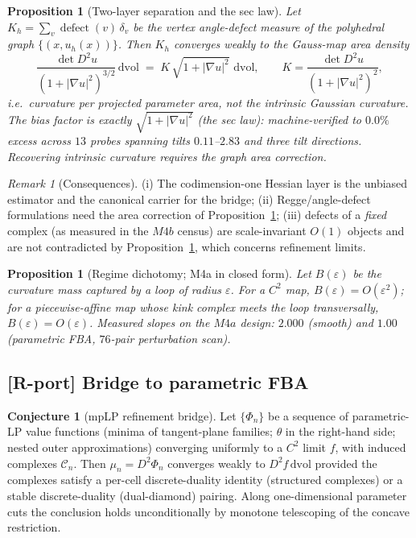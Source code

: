 \documentclass[11pt,a4paper]{article}
\theoremstyle{plain}
\newtheorem{proposition}[theorem]{Proposition}
\theoremstyle{definition}
\newtheorem{conjecture}[theorem]{Conjecture}
\theoremstyle{remark}
\newtheorem{remark}[theorem]{Remark}
\newcommand{\dvol}{\,\mathrm{dvol}}
\begin{document}
\begin{proposition}[Two-layer separation and the sec law]
\label{prop:seclaw}
Let $K_h = \sum_v \operatorname{defect}(v)\,\delta_v$ be the vertex
angle-defect measure of the polyhedral graph
$\{(x, u_h(x))\}$. Then $K_h$ converges weakly to the \emph{Gauss-map area
density}
\[
\frac{\det D^2 u}{\left(1 + |\nabla u|^2\right)^{3/2}} \dvol
\;=\; K\,\sqrt{1+|\nabla u|^2}\,\dvol,
\qquad
K = \frac{\det D^2 u}{(1+|\nabla u|^2)^2},
\]
i.e.\ curvature per projected parameter area, \emph{not} the intrinsic
Gaussian curvature. The bias factor is exactly
$\sqrt{1+|\nabla u|^2}$ (the sec law): machine-verified to $0.0\%$ excess
across $13$ probes spanning tilts $0.11$--$2.83$ and three tilt
directions. Recovering intrinsic curvature requires the graph area
correction.
\end{proposition}

\begin{remark}[Consequences]
(i) The codimension-one Hessian layer is the unbiased estimator and the
canonical carrier for the bridge; (ii) Regge/angle-defect formulations
need the area correction of Proposition~\ref{prop:seclaw}; (iii) defects
of a \emph{fixed} complex (as measured in the $M4b$ census) are
scale-invariant $O(1)$ objects and are not contradicted by
Proposition~\ref{prop:seclaw}, which concerns refinement limits.
\end{remark}

\begin{proposition}[Regime dichotomy; M4a in closed form]
\label{prop:dichotomy}
Let $B(\varepsilon)$ be the curvature mass captured by a loop of radius
$\varepsilon$. For a $C^2$ map, $B(\varepsilon) = O(\varepsilon^2)$; for a
piecewise-affine map whose kink complex meets the loop transversally,
$B(\varepsilon) = O(\varepsilon)$. Measured slopes on the
$M4a$ design: $2.000$ (smooth) and $1.00$ (parametric FBA,
$76$-pair perturbation scan).
\end{proposition}

\subsection{[R-port] Bridge to parametric FBA}

\begin{conjecture}[mpLP refinement bridge]\label{conj:bridge}
Let $\{\Phi_n\}$ be a sequence of parametric-LP value functions (minima of
tangent-plane families; $\theta$ in the right-hand side; nested outer
approximations) converging uniformly to a $C^2$ limit $f$, with induced
complexes $\mathcal{C}_n$. Then $\mu_n = D^2\Phi_n$ converges weakly to
$D^2 f \dvol$ provided the complexes satisfy a per-cell discrete-duality
identity (structured complexes) or a stable discrete-duality
(dual-diamond) pairing. Along one-dimensional parameter cuts the
conclusion holds unconditionally by monotone telescoping of the concave
restriction.
\end{conjecture}
\end{document}
